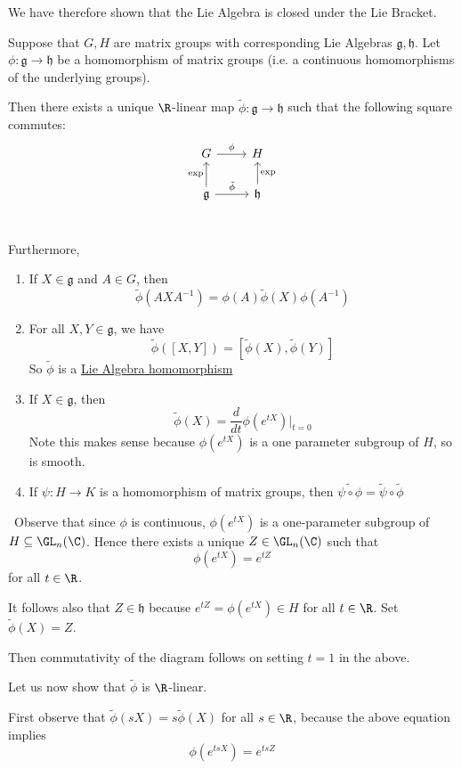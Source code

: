 \documentclass[x11names,reqno,14pt]{extarticle}
\newcommand{\mk}[1]{\mathfrak{#1}}
\newcommand{\g}{\mk{g}}
\newcommand{\h}{\mk{h}}
\newcommand{\dd}[2]{\frac{d#1}{d#2}}
\begin{document}
We have therefore shown that the Lie Algebra is closed under the Lie Bracket.

\thm

Suppose that $G, H$ are matrix groups with corresponding Lie Algebras $\mk{g}, \mk{h}$. Let $\phi:\mk{g}\to\mk{h}$ be a homomorphism of matrix groups (i.e. a continuous homomorphisms of the underlying groups). 

Then there exists a unique $\R$-linear map $\tilde{\phi}:\g\to\h$ such that the following square commutes:
\[
\begin{tikzcd}
G\ar[r, "\phi"] & H \\
\g \ar[u, "\exp"] \ar[r,"\tilde{\phi}"] & \h \ar[u, "\exp"']\\
\end{tikzcd}
\]

Furthermore,
\begin{enumerate}

\item If $X \in \g$ and $A \in G$, then 
\[
\tilde{\phi}(AXA^{-1}) = \phi(A)\tilde{\phi}(X)\phi(A^{-1})
\]

\item For all $X, Y \in \g$, we have
\[
\tilde{\phi}([X,Y]) = [\tilde{\phi}(X), \tilde{\phi}(Y)]
\]
So $\tilde{\phi}$ is a \underline{Lie Algebra homomorphism}

\item If $X \in \g$, then 
\[
\tilde{\phi}(X) = \dd{}{t}\phi(e^{tX})|_{t=0} 
\]
Note this makes sense because $\phi(e^{tX})$ is a one parameter subgroup of $H$, so is smooth. 

\item If $\psi:H\to K$ is a homomorphism of matrix groups, then $\widetilde{\psi\circ\phi} = \tilde{\psi}\circ\tilde{\phi}$

\end{enumerate}

\proof
\,
Observe that since $\phi$ is continuous, $\phi(e^{tX})$ is a one-parameter subgroup of $H \subseteq \GL_n(\C)$. Hence there exists a unique $Z \in \GL_n(\C)$ such that 
\[
\phi(e^{tX}) = e^{tZ}
\]
 for all $t \in \R$.

It follows also that $Z \in \h$ because $e^{tZ} = \phi(e^{tX}) \in H$ for all $t \in \R$. Set $\tilde{\phi}(X) = Z$. 

Then commutativity of the diagram follows on setting $t = 1$ in the above. 

Let us now show that $\tilde{\phi}$ is $\R$-linear. 

First observe that $\tilde{\phi}(sX) = s\tilde{\phi}(X)$ for all $s \in \R$, because the above equation implies 
\[
\phi(e^{tsX}) = e^{tsZ}
\]
\end{document}
